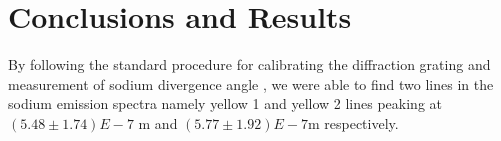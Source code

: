 \documentclass[11pt]{article}
\begin{document}
\section{Conclusions and Results}
By following the standard procedure for calibrating the diffraction grating and measurement of sodium divergence angle , we were able to find two lines in the sodium emission spectra namely yellow 1 and yellow 2 lines peaking at $(5.48 \pm 1.74)E -7 $ m and $(5.77 \pm 1.92)E -7 $m respectively.
\end{document}
